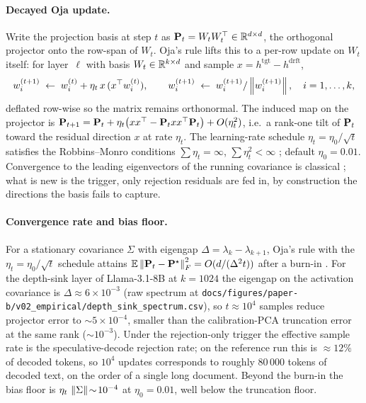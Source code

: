 \documentclass[11pt]{article}
\begin{document}
\paragraph{Decayed Oja update.}  Write the projection basis at step $t$ as
$\mathbf{P}_t=W_tW_t^\top\in\mathbb{R}^{d\times d}$, the orthogonal projector onto
the row-span of $W_t$. Oja's rule lifts this to a per-row update on
$W_t$ itself: for layer~$\ell$ with basis $W_t\in\mathbb{R}^{k\times d}$ and
sample $x=h^\text{tgt}-h^\text{drft}$,
\begin{equation}
w_i^{(t+1)} \;\leftarrow\; w_i^{(t)} + \eta_t\,x\,(x^\top w_i^{(t)}),
\qquad w_i^{(t+1)} \;\leftarrow\; w_i^{(t+1)}/\left\lVert w_i^{(t+1)} \right\rVert,
\quad i=1,\dots,k,
\label{eq:oja}
\end{equation}
deflated row-wise so the matrix remains orthonormal. The induced map on
the projector is
$\mathbf{P}_{t+1}=\mathbf{P}_t+\eta_t\bigl(xx^\top-\mathbf{P}_t xx^\top\mathbf{P}_t\bigr)+O(\eta_t^2)$,
i.e.\ a rank-one tilt of $\mathbf{P}_t$ toward the residual direction $x$ at
rate $\eta_t$. The learning-rate schedule $\eta_t=\eta_0/\sqrt t$
satisfies the Robbins--Monro conditions $\sum\eta_t=\infty$,
$\sum\eta_t^2<\infty$ \cite{robbins1951sa}; default $\eta_0=0.01$.
Convergence to the leading eigenvectors of the running covariance is
classical \cite{oja1982}; what is new is the trigger, only rejection
residuals are fed in, by construction the directions the basis fails to
capture.

\paragraph{Convergence rate and bias floor.}
For a stationary covariance $\Sigma$ with eigengap
$\Delta=\lambda_k-\lambda_{k+1}$, Oja's rule with the
$\eta_t=\eta_0/\sqrt t$ schedule attains
$\mathbb{E}\left\lVert \mathbf{P}_t-\mathbf{P}^\star \right\rVert_F^2 = O(d/(\Delta^2 t))$ after a burn-in
\cite{allen2017first,jain2016streaming}. For the depth-sink layer of
Llama-3.1-8B at $k{=}1024$ the eigengap on the activation covariance is
$\Delta\approx 6\times 10^{-3}$ (raw spectrum at
\texttt{docs/figures/paper-b/v02\_empirical/depth\_sink\_spectrum.csv}),
so $t\!\approx\!10^4$ samples reduce projector error to
$\sim 5\times 10^{-4}$, smaller than the calibration-PCA truncation
error at the same rank ($\sim 10^{-3}$). Under the rejection-only
trigger the effective sample rate is the speculative-decode rejection
rate; on the reference run this is $\approx 12\%$ of decoded tokens, so
$10^4$ updates corresponds to roughly $80\,000$ tokens of decoded text,
on the order of a single long document. Beyond the burn-in the bias
floor is $\eta_t\,\left\lVert \Sigma \right\rVert\!\sim\!10^{-4}$ at $\eta_0{=}0.01$, well
below the truncation floor.
\end{document}

